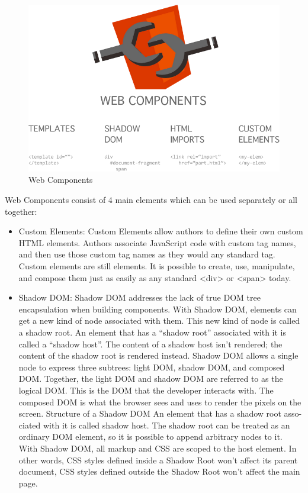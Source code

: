 \begin{figure}[htb]
 \centering
 \includegraphics[width=1.0\linewidth]{images/chapter3/web_cmpts.png}\hfill
 \caption[Web Components]{Web Components}
 \label{fig:fourV}
\end{figure}
Web Components consist of 4 main elements which can be used separately or all together:
\begin{itemize}
\item Custom Elements: Custom Elements allow authors to define their own custom HTML elements. Authors associate JavaScript code with custom tag names, and then use those custom tag names as they would any standard tag.  Custom elements are still elements.  It is possible to create, use,
manipulate, and compose them just as easily as any standard <div> or <span> today.\cite{tch_custom}
\end{itemize}
\begin{itemize}
\item Shadow DOM: Shadow DOM addresses the lack of true DOM tree encapsulation when building components. With Shadow DOM, elements can get a new kind of node associated with them. This new kind of node is called a shadow root.  An element that has a “shadow root”  associated with it is called  a “shadow host”. The content of a shadow host isn’t rendered; the content of the shadow root is rendered instead.  Shadow DOM allows   a single node to express three subtrees:  light DOM, shadow DOM,  and composed DOM. Together, the light DOM and shadow DOM are referred to as the logical DOM. This is the DOM that the developer interacts with. The composed DOM is what the browser sees and uses to render the pixels on the  screen.\cite{tch_dom}
\newline
Structure of a Shadow DOM An element that has a shadow root asso- ciated with it is called shadow host. The shadow root can be treated as an ordinary DOM element, so it is possible to append arbitrary nodes to it. With Shadow DOM, all markup and CSS are scoped to the host element. In other words, CSS styles defined inside a Shadow Root won’t affect its parent document, CSS styles defined outside the Shadow Root won’t affect the main page.
\end{itemize}
